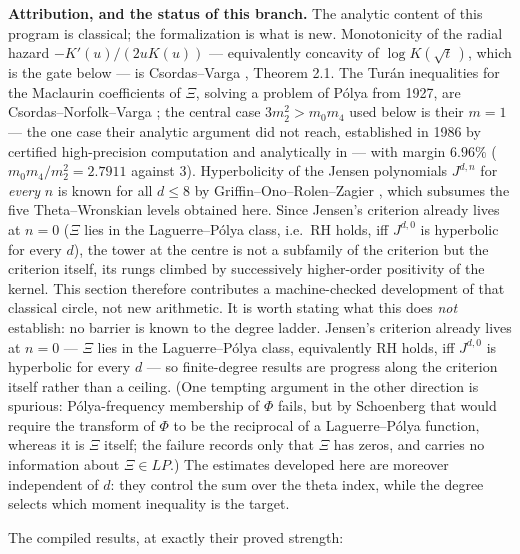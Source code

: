 \documentclass[11pt]{article}
\theoremstyle{plain}
\theoremstyle{definition}
\theoremstyle{remark}
\begin{document}
\medskip
\noindent\textbf{Attribution, and the status of this branch.}  The analytic
content of this program is classical; the formalization is what is new.
Monotonicity of the radial hazard $-K'(u)/(2uK(u))$ --- equivalently
concavity of $\log K(\sqrt t\,)$, which is the gate below --- is
Csordas--Varga \cite{CsordasVarga1988}, Theorem 2.1.  The Tur\'an
inequalities for the Maclaurin coefficients of $\Xi$, solving a problem of
P\'olya from 1927, are Csordas--Norfolk--Varga
\cite{CsordasNorfolkVarga1986}; the central case $3m_2^2>m_0m_4$ used below
is their $m=1$ --- the one case their analytic argument did not reach,
established in 1986 by certified high-precision computation and analytically
in \cite{CsordasVarga1988} --- with margin $6.96\%$ ($m_0m_4/m_2^2=2.7911$
against $3$).  Hyperbolicity of the Jensen polynomials $J^{d,n}$ for
\emph{every} $n$ is known for all $d\le8$ by Griffin--Ono--Rolen--Zagier
\cite{GORZ2019}, which subsumes the five Theta--Wronskian levels obtained
here.  Since Jensen's criterion already lives at $n=0$ ($\Xi$ lies in the
Laguerre--P\'olya class, i.e.\ RH holds, iff $J^{d,0}$ is hyperbolic for
every $d$), the tower at the centre is not a subfamily of the criterion but
the criterion itself, its rungs climbed by successively higher-order
positivity of the kernel.  This section therefore contributes a
machine-checked development of that classical circle, not new arithmetic.
It is worth stating what this does \emph{not} establish: no barrier is known
to the degree ladder. Jensen's criterion already lives at $n=0$ --- $\Xi$ lies
in the Laguerre--P\'olya class, equivalently RH holds, iff $J^{d,0}$ is
hyperbolic for every $d$ --- so finite-degree results are progress along the
criterion itself rather than a ceiling. (One tempting argument in the other
direction is spurious: P\'olya-frequency membership of $\Phi$ fails, but by
Schoenberg that would require the transform of $\Phi$ to be the reciprocal of
a Laguerre--P\'olya function, whereas it is $\Xi$ itself; the failure records
only that $\Xi$ has zeros, and carries no information about $\Xi\in LP$.) The
estimates developed here are moreover independent of $d$: they control the
sum over the theta index, while the degree selects which moment inequality is
the target.

\medskip
\noindent The compiled results, at exactly their proved strength:
\end{document}
